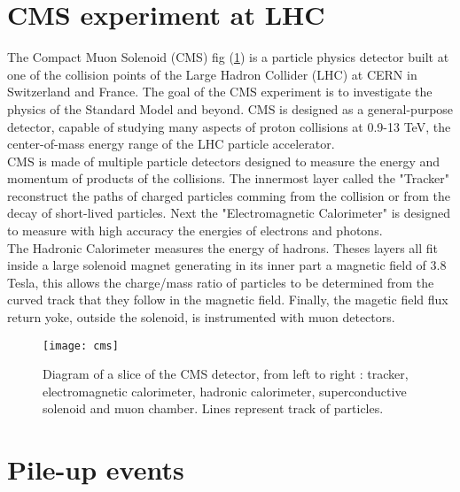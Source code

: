 \label{chap:premierchapitre}

\section{CMS experiment at LHC}

The Compact Muon Solenoid (CMS) fig (\ref{cms}) is a particle physics detector built at one of the collision points of the Large Hadron Collider
(LHC) at CERN in Switzerland and France. The goal of the CMS experiment is to investigate the physics of the Standard Model and beyond.
CMS is designed as a general-purpose detector, capable of studying many aspects of proton collisions at 0.9-13 TeV, the
center-of-mass energy range of the LHC particle accelerator.\\
CMS is made of multiple particle detectors designed to measure the energy and momentum of products of the collisions.
The innermost layer called the "Tracker" reconstruct the paths of charged particles comming from the collision or from the
decay of short-lived particles.
Next the "Electromagnetic Calorimeter" is designed to measure with high accuracy the energies of electrons and
photons.\\
The Hadronic Calorimeter measures the energy of hadrons.%
Theses layers all fit inside a large solenoid magnet generating in its inner part a magnetic field of 3.8 Tesla, this allows the charge/mass ratio of particles to be
determined from the curved track that they follow in the magnetic field.
Finally, the magetic field flux return yoke, outside the solenoid, is instrumented with muon detectors.

\begin{figure}[h!]
  \centering
  \texttt{[image: cms]}\\[1cm]
  \caption{Diagram of a slice of the CMS detector, from left to right : tracker, electromagnetic calorimeter, hadronic
  calorimeter, superconductive solenoid and muon chamber. Lines represent track of particles.}
  \label{cms}
\end{figure}


\section{Pile-up events}

